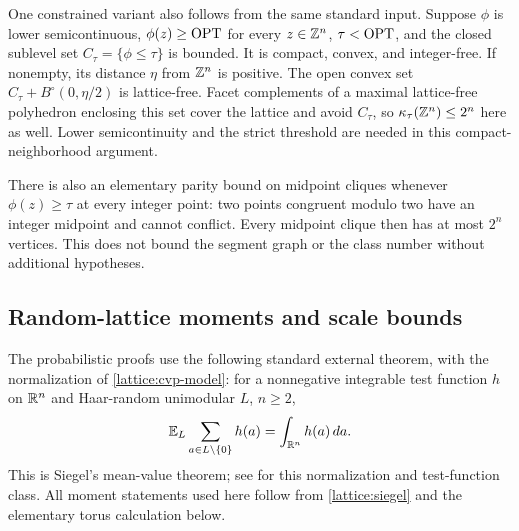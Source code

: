 One constrained variant also follows from the same standard input.
Suppose $\phi$ is lower semicontinuous, $\phi(z)\ge\operatorname{OPT}$ for every
$z\in\mathbb{Z}^n$, $\tau<\operatorname{OPT}$, and the closed sublevel set
$C_\tau=\{\phi\le\tau\}$ is bounded. It is compact, convex, and
integer-free. If nonempty, its distance $\eta$ from $\mathbb{Z}^n$ is positive.
The open convex set $C_\tau+B^\circ(0,\eta/2)$ is lattice-free. Facet
complements of a maximal lattice-free polyhedron enclosing this set
cover the lattice and avoid $C_\tau$, so
$\kappa_\tau(\mathbb{Z}^n)\le2^n$ here as well. Lower semicontinuity and the
strict threshold are needed in this compact-neighborhood argument.

There is also an elementary parity bound on midpoint cliques whenever
$\phi(z)\ge\tau$ at every integer point: two points congruent modulo two
have an integer midpoint and cannot conflict. Every midpoint clique then
has at most $2^n$ vertices. This does not bound the segment graph or the
class number without additional hypotheses.

\subsection{Random-lattice moments and scale bounds}
\label{app:lattice:cvp-proof}

The probabilistic proofs use the following standard external theorem, with
the normalization of \eqref{lattice:cvp-model}: for a nonnegative integrable
test function $h$ on $\mathbb{R}^n$ and Haar-random unimodular $L$, $n\ge2$,
\begin{equation}
 \mathbb{E}_L\sum_{a\in L\setminus\{0\}}h(a)=\int_{\mathbb{R}^n}h(a)\,da.
 \label{lattice:siegel}
\end{equation}
This is Siegel's mean-value theorem; see
\citet[Theorem~3.2 and Remark~3.3]{skenderi2021RandomLatticesSiegel} for
this normalization and test-function class. All moment statements used here follow
from \eqref{lattice:siegel} and the elementary torus calculation below.

